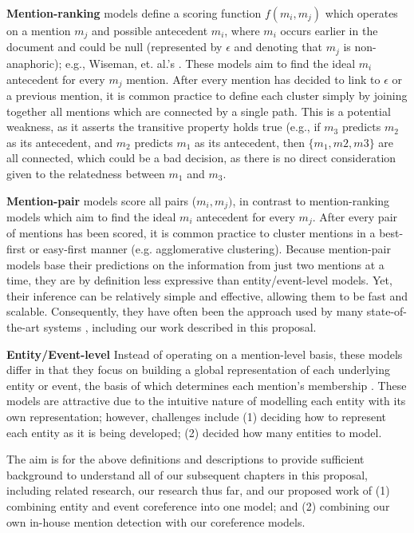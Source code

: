 \textbf{Mention-ranking} models define a scoring function $f(m_i,m_j)$ which operates on a mention $m_j$ and possible antecedent $m_i$, where $m_i$ occurs earlier in the document and could be null (represented by $\epsilon$ and denoting that $m_j$ is non-anaphoric); e.g., Wiseman, et. al.'s \cite{DBLP:conf/acl/WisemanRSW15}.  These models aim to find the ideal $m_i$ antecedent for every $m_j$ mention.  After every mention has decided to link to $\epsilon$ or a previous mention, it is common practice to define each cluster simply by joining together all mentions which are connected by a single path.  This is a potential weakness, as it asserts the transitive property holds true (e.g., if $m_3$ predicts $m_2$ as its antecedent, and $m_2$ predicts $m_1$ as its antecedent, then $\{m_1,m2,m3\}$ are all connected, which could be a bad decision, as there is no direct consideration given to the relatedness between $m_1$ and $m_3$.

\textbf{Mention-pair} models score all pairs ($m_i,m_j)$, in contrast to mention-ranking models which aim to find the ideal $m_i$ antecedent for every $m_j$.  After every pair of mentions has been scored, it is common practice to cluster mentions in a best-first or easy-first manner (e.g. agglomerative clustering).  Because mention-pair models base their predictions on the information from just two mentions at a time, they are by definition less expressive than entity/event-level models.  Yet, their inference can be relatively simple and effective, allowing them to be fast and scalable.  Consequently, they have often been the approach used by many state-of-the-art systems \cite{Soon:2001:MLA:972597.972602, DBLP:conf/emnlp/DurrettK13}, including our work described in this proposal.

\textbf{Entity/Event-level} Instead of operating on a mention-level basis, these models differ in that they focus on building a global representation of each underlying entity or event, the basis of which determines each mention's membership \cite{DBLP:conf/naacl/WisemanRS16, clark2016improving}.  These models are attractive due to the intuitive nature of modelling each entity with its own representation; however, challenges include (1) deciding how to represent each entity as it is being developed; (2) decided how many entities to model.

The aim is for the above definitions and descriptions to provide sufficient background to understand all of our subsequent chapters in this proposal, including related research, our research thus far, and our proposed work of (1) combining entity and event coreference into one model; and (2) combining our own in-house mention detection with our coreference models.